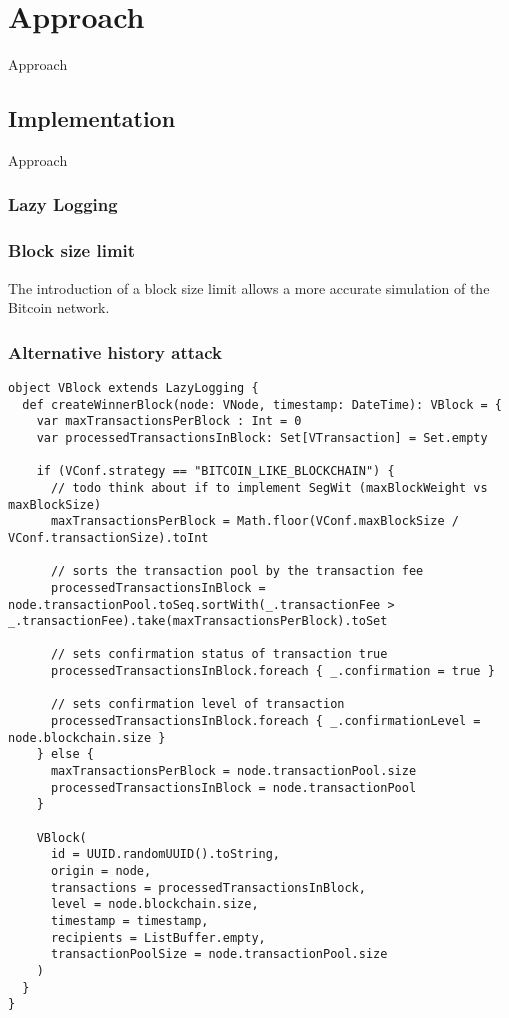 \chapter{Approach}\label{chapter:approach}
Approach

\section{Implementation}
Approach

\subsection{Lazy Logging}


\subsection{Block size limit}
The introduction of a block size limit allows a more accurate simulation of the Bitcoin network.

\subsection{Alternative history attack}

\begin{minipage}{\linewidth}
\begin{lstlisting}[style=myScalastyle]
object VBlock extends LazyLogging {
  def createWinnerBlock(node: VNode, timestamp: DateTime): VBlock = {
    var maxTransactionsPerBlock : Int = 0
    var processedTransactionsInBlock: Set[VTransaction] = Set.empty

    if (VConf.strategy == "BITCOIN_LIKE_BLOCKCHAIN") {
      // todo think about if to implement SegWit (maxBlockWeight vs maxBlockSize)
      maxTransactionsPerBlock = Math.floor(VConf.maxBlockSize / VConf.transactionSize).toInt

      // sorts the transaction pool by the transaction fee
      processedTransactionsInBlock = node.transactionPool.toSeq.sortWith(_.transactionFee > _.transactionFee).take(maxTransactionsPerBlock).toSet

      // sets confirmation status of transaction true
      processedTransactionsInBlock.foreach { _.confirmation = true }

      // sets confirmation level of transaction
      processedTransactionsInBlock.foreach { _.confirmationLevel = node.blockchain.size }
    } else {
      maxTransactionsPerBlock = node.transactionPool.size
      processedTransactionsInBlock = node.transactionPool
    }

    VBlock(
      id = UUID.randomUUID().toString,
      origin = node,
      transactions = processedTransactionsInBlock,
      level = node.blockchain.size,
      timestamp = timestamp,
      recipients = ListBuffer.empty,
      transactionPoolSize = node.transactionPool.size
    )
  }
}
\end{lstlisting}
\end{minipage}